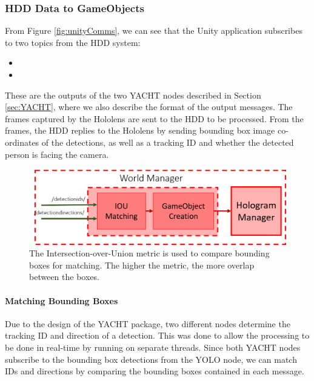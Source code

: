 \subsubsection{HDD Data to GameObjects} 
From Figure \ref{fig:unityComms}, we can see that the Unity application subscribes to two topics from the HDD system:

\begin{itemize}
	\item {}
	\item {}
\end{itemize}

These are the outputs of the two YACHT nodes described in Section \ref{sec:YACHT}, where we also describe the format of the output messages. The frames captured by the Hololens are sent to the HDD to be processed. From the frames, the HDD replies to the Hololens by sending bounding box image co-ordinates of the detections, as well as a tracking ID and whether the detected person is facing the camera.

\begin{figure}[ht]
	\centering
	\includegraphics[width=0.9\linewidth]{img/chapter5_implementation/holoworldbreakdown.png}
	\caption{The Intersection-over-Union metric is used to compare bounding boxes for matching. The higher the metric, the more overlap between the boxes.}
	\label{fig:ioumatching}
\end{figure}

\paragraph{Matching Bounding Boxes} Due to the design of the YACHT package, two different nodes determine the tracking ID and direction of a detection. This was done to allow the processing to be done in real-time by running on separate threads. Since both YACHT nodes subscribe to the bounding box detections from the YOLO node, we can match IDs and directions by comparing the bounding boxes contained in each message. \\

